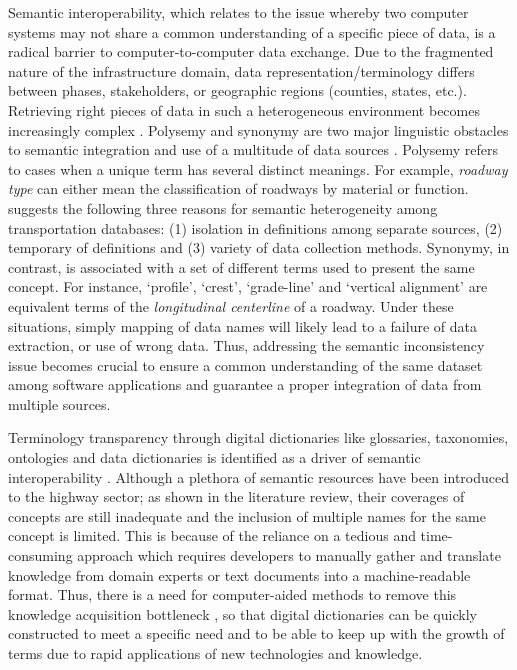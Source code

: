 \documentclass[Journal, BackFigs,NoLists, DoubleSpace]{ascelike}%
\begin{document}
Semantic interoperability, which relates to the issue whereby two computer systems may not share a common understanding of a specific piece of data, is a radical barrier to computer-to-computer data exchange. Due to the fragmented nature of the infrastructure domain, data representation/terminology differs between phases, stakeholders, or geographic regions (counties, states, etc.). Retrieving right pieces of data in such a heterogeneous environment becomes increasingly complex \cite{karimi2003semantic}. Polysemy and synonymy are two major linguistic obstacles to semantic integration and use of a multitude of data sources \cite{noy04}. Polysemy refers to cases when a unique term has several distinct meanings. For example, \textit{roadway type} can either mean the classification of roadways by material or function.  suggests the following three reasons for semantic heterogeneity among transportation databases: (1) isolation in definitions among separate sources, (2) temporary of definitions and (3) variety of data collection methods. Synonymy, in contrast, is associated with a set of different terms used to present the same concept. For instance, `profile', `crest', `grade-line' and `vertical alignment' are equivalent terms of the \textit{longitudinal centerline} of a roadway. Under these situations, simply mapping of data names will likely lead to a failure of data extraction, or use of wrong data. Thus, addressing the semantic inconsistency issue becomes crucial to ensure a common understanding of the same dataset among software applications and guarantee a proper integration of data from multiple sources. 
\par
%
Terminology transparency through digital dictionaries like glossaries, taxonomies, ontologies and data dictionaries is identified as a driver of semantic interoperability \cite{ouksel99}. Although a plethora of semantic resources have been introduced to the highway sector; as shown in the literature review, their coverages of concepts are still inadequate and the inclusion of multiple names for the same concept is limited. This is because of the reliance on a tedious and time-consuming approach which requires developers to manually gather and translate knowledge from domain experts or text documents into a machine-readable format. Thus, there is a need for computer-aided methods to remove this knowledge acquisition bottleneck \cite{mounce10}, so that digital dictionaries can be quickly constructed to meet a specific need and to be able to keep up with the growth of terms due to rapid applications of new technologies and knowledge.
\end{document}
